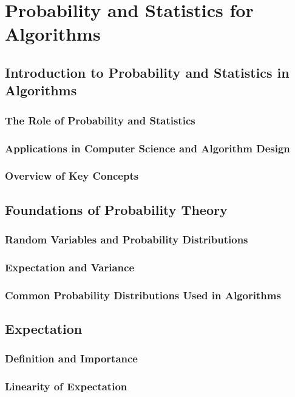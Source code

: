 \documentclass[12pt]{book} %
\begin{document}
\chapter{Probability and Statistics for Algorithms}

\section{Introduction to Probability and Statistics in Algorithms}
\subsection{The Role of Probability and Statistics}
\subsection{Applications in Computer Science and Algorithm Design}
\subsection{Overview of Key Concepts}

\section{Foundations of Probability Theory}
\subsection{Random Variables and Probability Distributions}
\subsection{Expectation and Variance}
\subsection{Common Probability Distributions Used in Algorithms}

\section{Expectation}
\subsection{Definition and Importance}
\subsection{Linearity of Expectation}
\end{document}
